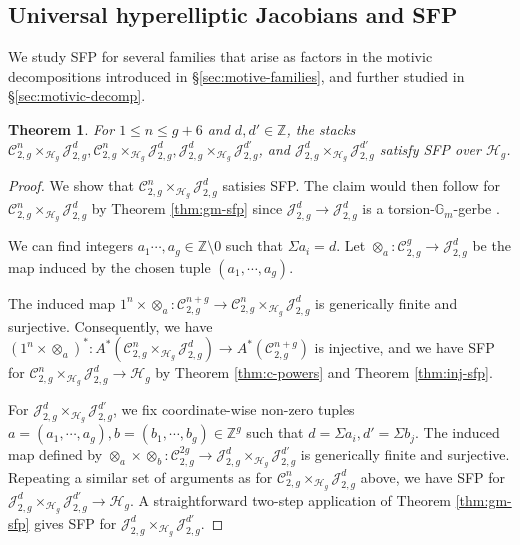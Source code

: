 \documentclass[11pt]{amsart}
\newcommand\Z{\mathbb{Z}}
\newtheorem{theorem}{Theorem}[section]
\theoremstyle{definition}
\newcommand{\ri}{\rightarrow}
\newcommand{\J}{\mathscr{J}}
\newcommand{\jac}{\mathcal{J}}
\newcommand{\h}{\mathcal{H}}
\newcommand{\mC}{\mathcal{C}}
\begin{document}
\subsection{Universal hyperelliptic Jacobians and SFP}
We study SFP for several families that arise as factors in the motivic decompositions introduced in \S \ref{sec:motive-families}, and further studied in \S\ref{sec:motivic-decomp}.
\begin{theorem}\label{thm:sfp}
        For $1\leq n\leq g+6$ and $d,d'\in\Z$, the stacks $\mC_{2,g}^n\times_{\h_g}\jac^d_{2,g}, \mC_{2,g}^n\times_{\h_g}\J^d_{2,g}, \jac^d_{2,g}\times_{\h_g} \jac^{d'}_{2,g}$, and $\J^d_{2,g}\times_{\h_g} \J^{d'}_{2,g}$ satisfy SFP over $\h_g$.
\end{theorem}
\begin{proof}
We show that $\mC_{2,g}^n\times_{\h_g}\jac^d_{2,g}$ satisies SFP. 
The claim would then follow for $\mC_{2,g}^n\times_{\h_g}\J^d_{2,g}$ by Theorem \ref{thm:gm-sfp} since $\J^d_{2,g}\ri \jac^d_{2,g}$ is a torsion-$\mathbb{G}_m$-gerbe \cite[Proposition 6.6]{melo}.

We can find integers $a_1\cdots,a_g\in \Z \setminus 0$ such that $\Sigma a_i = d$. Let $\otimes_a:\mC_{2,g}^g\ri \jac^d_{2,g}$ be the map induced by the chosen tuple $(a_1,\cdots,a_g)$. 

The induced map $1^n\times \otimes_a: \mC_{2,g}^{n+g}\ri \mC_{2,g}^n\times_{\h_g}\jac^d_{2,g}$ is generically finite and surjective. Consequently, we have $(1^n\times \otimes_a)^*: A^*(\mC_{2,g}^n\times_{\h_g}\jac^d_{2,g})\ri A^*(\mC_{2,g}^{n+g})$ is injective, and we have SFP for $\mC_{2,g}^n\times_{\h_g}\jac^d_{2,g}\ri \h_g$ by Theorem \ref{thm:c-powers} and Theorem \ref{thm:inj-sfp}.

For $\jac^d_{2,g}\times_{\h_g} \jac^{d'}_{2,g}$, we fix coordinate-wise non-zero tuples $a= (a_1,\cdots,a_g),b=(b_1,\cdots, b_g)\in\Z^g$ such that $d=\Sigma a_i, d'=\Sigma b_j$. The induced map defined by $\otimes_a\times\otimes_b: \mC^{2g}_{2,g}\ri \jac^d_{2,g}\times_{\h_g} \jac^{d'}_{2,g}$ is generically finite and surjective. Repeating a similar set of arguments as for $\mC_{2,g}^n\times_{\h_g}\jac^d_{2,g}$ above, we have SFP for $\jac^d_{2,g}\times_{\h_g} \jac^{d'}_{2,g}\ri \h_g$. A straightforward two-step application of Theorem \ref{thm:gm-sfp} gives SFP for $\J^d_{2,g}\times_{\h_g} \J^{d'}_{2,g}$.
\end{proof}
\end{document}
